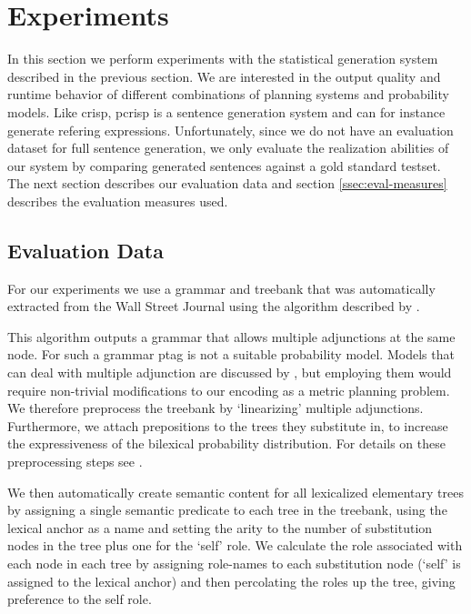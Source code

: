\section{Experiments}
\label{sec:experiments}
In this section we perform experiments with the statistical generation system described in the previous section.  We are interested in the output quality and runtime behavior of different combinations of planning systems and probability models. Like {\sc crisp}, {\sc pcrisp} is a sentence generation system and can for instance generate refering expressions. Unfortunately, since we do not have an evaluation dataset for full sentence generation, we only evaluate the realization abilities of our system by comparing generated sentences against a gold standard testset. The next section describes our evaluation data and section \ref{ssec:eval-measures} describes the evaluation measures used. 

\subsection{Evaluation Data}
For our experiments we use a grammar and treebank that was automatically extracted from the Wall Street Journal using the algorithm described by .   

This algorithm outputs a grammar that allows multiple adjunctions at the same node. For such a grammar {\sc ptag} is not a suitable probability model. Models that can deal with multiple adjunction are discussed by , but employing them would require non-trivial modifications to our encoding as a metric planning problem. We therefore preprocess the treebank by `linearizing' multiple adjunctions. Furthermore, we attach prepositions to the trees they substitute in, to increase the expressiveness of the bilexical probability distribution. For details on these preprocessing steps see \cite{bauer2009}.

We then automatically create semantic content for all lexicalized elementary trees by assigning a single semantic predicate to each tree in the treebank, using the lexical anchor as a name and setting the arity to the number of substitution nodes in the tree plus one for the `self' role.  We calculate the role associated with each node in each tree by assigning role-names to each substitution node (`self' is assigned to the lexical anchor) and then percolating the roles up the tree, giving preference to the self role.  

